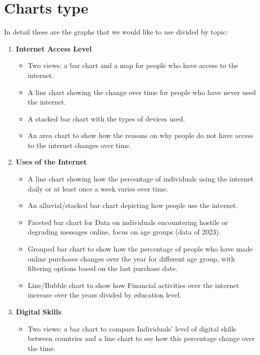 \documentclass[12pt]{article}
\begin{document}
\section{Charts type}
In detail these are the graphs that we would like to use divided by topic:
\begin{enumerate}
    \item \textbf{Internet Access Level}
          \begin{itemize}
              \item Two views: a bar chart and a map for people who have access to the internet.
              \item A line chart showing the change over time for people who have never used the internet.
              \item A stacked bar chart with the types of devices used.
              \item An area chart to show how the reasons on why people do not have access to the internet changes over time.
          \end{itemize}
    \item \textbf{Uses of the Internet}
          \begin{itemize}
              \item A line chart showing how the percentage of individuals using the internet daily or at least once a
                    week varies over time.
              \item An alluvial/stacked bar chart depicting how people use the internet.
              \item Faceted bar chart for Data on individuals encountering hostile or degrading messages online,
                    focus on age groups (data of 2023).
              \item Grouped bar chart to show how the percentage of people who have made online purchases changes
                    over the year for different age group, with filtering options based on the last purchase date.
              \item Line/Bubble chart to show how Financial activities over the internet increase over the years divided by education level.
          \end{itemize}
    \item \textbf{Digital Skills}
          \begin{itemize}
              \item Two views: a bar chart to compare Individuals' level of digital skills between countries and a line chart to
                    see how this percentage change over the time.

\end{itemize}
\end{enumerate}
\end{document}
